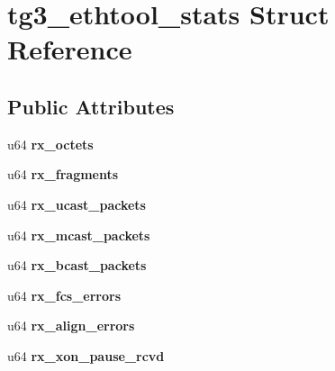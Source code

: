 \hypertarget{structtg3__ethtool__stats}{
\section{tg3\_\-ethtool\_\-stats Struct Reference}
\label{structtg3__ethtool__stats}
}
\subsection*{Public Attributes}
\begin{DoxyCompactItemize}
\item 
\hypertarget{structtg3__ethtool__stats_a739ed172a245904e32b142ec38c22e30}{
u64 {\bfseries rx\_\-octets}}
\label{structtg3__ethtool__stats_a739ed172a245904e32b142ec38c22e30}

\item 
\hypertarget{structtg3__ethtool__stats_a2e3fbebfc442765df8700dfd5cb54343}{
u64 {\bfseries rx\_\-fragments}}
\label{structtg3__ethtool__stats_a2e3fbebfc442765df8700dfd5cb54343}

\item 
\hypertarget{structtg3__ethtool__stats_a24671de1927a37d40041fa514e2649da}{
u64 {\bfseries rx\_\-ucast\_\-packets}}
\label{structtg3__ethtool__stats_a24671de1927a37d40041fa514e2649da}

\item 
\hypertarget{structtg3__ethtool__stats_a006cd27b3e04a8e9b4699fb4284e2667}{
u64 {\bfseries rx\_\-mcast\_\-packets}}
\label{structtg3__ethtool__stats_a006cd27b3e04a8e9b4699fb4284e2667}

\item 
\hypertarget{structtg3__ethtool__stats_a1c791ab9dba7e01f5b512cf8161fb2f4}{
u64 {\bfseries rx\_\-bcast\_\-packets}}
\label{structtg3__ethtool__stats_a1c791ab9dba7e01f5b512cf8161fb2f4}

\item 
\hypertarget{structtg3__ethtool__stats_a6af88cb61a757b71c2b264eba3747be9}{
u64 {\bfseries rx\_\-fcs\_\-errors}}
\label{structtg3__ethtool__stats_a6af88cb61a757b71c2b264eba3747be9}

\item 
\hypertarget{structtg3__ethtool__stats_a8b3731a531233eab9f678fc51ebc36a6}{
u64 {\bfseries rx\_\-align\_\-errors}}
\label{structtg3__ethtool__stats_a8b3731a531233eab9f678fc51ebc36a6}

\item 
\hypertarget{structtg3__ethtool__stats_af8760ad9091180dc72a55da9c54387b7}{
u64 {\bfseries rx\_\-xon\_\-pause\_\-rcvd}}
\label{structtg3__ethtool__stats_af8760ad9091180dc72a55da9c54387b7}


\end{DoxyCompactItemize}
